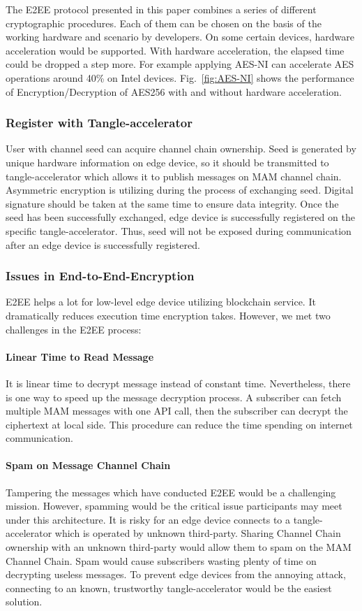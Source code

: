 \documentclass[conference]{IEEEtran}
\begin{document}
The E2EE protocol presented in this paper combines a series of different cryptographic procedures. Each of them can be chosen on the basis of the working hardware and scenario by developers. On some certain devices, hardware acceleration would be supported. With hardware acceleration, the elapsed time could be dropped a step more. For example applying AES-NI can accelerate AES operations around 40\% on Intel devices.\cite{AES-NI-Acceleration} Fig.~\ref{fig:AES-NI} shows the performance of Encryption/Decryption of AES256 with and without hardware acceleration.

\subsubsection{Register with Tangle-accelerator}
User with channel seed can acquire channel chain ownership. Seed is generated by unique hardware information on edge device, so it should be transmitted to tangle-accelerator which allows it to publish messages on MAM channel chain. Asymmetric encryption is utilizing during the process of exchanging seed. Digital signature should be taken at the same time to ensure data integrity. Once the seed has been successfully exchanged, edge device is successfully registered on the specific tangle-accelerator. Thus, seed will not be exposed during communication after an edge device is successfully registered.

\subsubsection{Issues in End-to-End-Encryption}
E2EE helps a lot for low-level edge device utilizing blockchain service. It dramatically reduces execution time encryption takes. However, we met two challenges in the E2EE process:

\paragraph{Linear Time to Read Message}
It is linear time to decrypt message instead of constant time. Nevertheless, there is one way to speed up the message decryption process. A subscriber can fetch multiple MAM messages with one API call, then the subscriber can decrypt the ciphertext at local side. This procedure can reduce the time spending on internet communication.

\paragraph{Spam on Message Channel Chain}
Tampering the messages which have conducted E2EE would be a challenging mission. However, spamming would be the critical issue participants may meet under this architecture. It is risky for an edge device connects to a tangle-accelerator which is operated by unknown third-party. Sharing Channel Chain ownership with an unknown third-party would allow them to spam on the MAM Channel Chain. Spam would cause subscribers wasting plenty of time on decrypting useless messages. To prevent edge devices from the annoying attack, connecting to an known, trustworthy tangle-accelerator would be the easiest solution.
\end{document}
